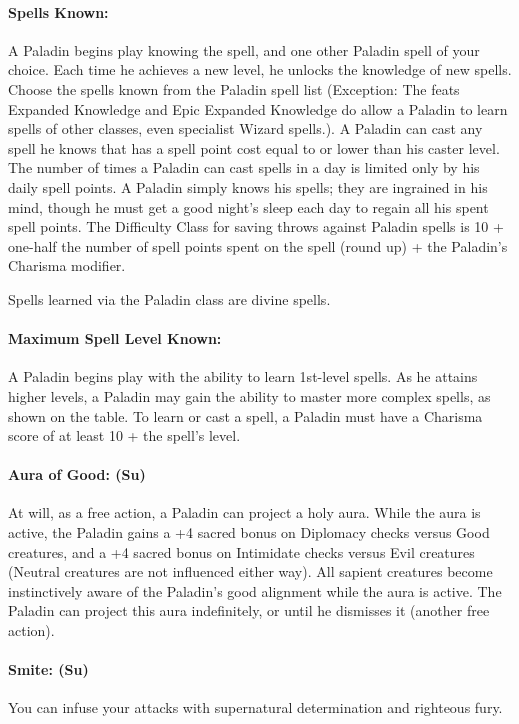\paragraph{Spells Known:} A Paladin begins play knowing the  spell, and one other Paladin spell of your choice. 
Each time he achieves a new level, he unlocks the knowledge of new spells.
Choose the spells known from the Paladin spell list
(Exception: The feats Expanded Knowledge and Epic Expanded Knowledge do allow a Paladin to learn spells of other classes, even specialist Wizard spells.).
A Paladin can cast any spell he knows that has a spell point cost equal to or lower than his caster level.
The number of times a Paladin can cast spells in a day is limited only by his daily spell points. 
A Paladin simply knows his spells; they are ingrained in his mind, though he must get a good night's sleep each day to regain all his spent spell points.
The Difficulty Class for saving throws against Paladin spells is 10 + one-half the number of spell points spent on the spell (round up) + the Paladin's Charisma modifier. 

Spells learned via the Paladin class are divine spells.
\paragraph{Maximum Spell Level Known:} A Paladin begins play with the ability to learn 1st-level spells. 
As he attains higher levels, a Paladin may gain the ability to master more complex spells, as shown on the  table.
To learn or cast a spell, a Paladin must have a Charisma score of at least 10 + the spell's level.

\paragraph{Aura of Good: (Su)} 
At will, as a free action, a Paladin can project a holy aura.
While the aura is active, the Paladin gains a +4 sacred bonus on Diplomacy checks versus Good creatures, and a +4 sacred bonus on Intimidate checks versus Evil creatures (Neutral creatures are not influenced either way).
All sapient creatures become instinctively aware of the Paladin's good alignment while the aura is active.
The Paladin can project this aura indefinitely, or until he dismisses it (another free action). 

\paragraph[Smite]{Smite: (Su)}
\label{sec:Smite}
You can infuse your attacks with supernatural determination and righteous fury.

